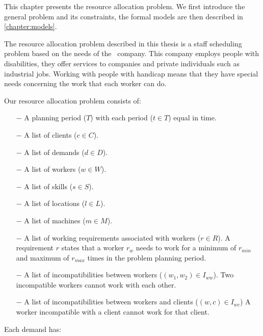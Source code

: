\documentclass[../thesis.tex]{subfiles}
\begin{document}
This chapter presents the resource allocation problem.
We first introduce the general problem and its constraints, 
the formal models are then described in \autoref{chapter:models}.

The resource allocation problem described in this thesis is a staff scheduling problem based on the needs of the \vone\ company. 
This company employs people with disabilities, they offer services to companies and private individuals such 
as industrial jobs. Working with people with handicap means that they have special needs concerning
the work that each worker can do.




Our resource allocation problem consists of:

\begin{itemize}
  \item[$-$] A planning period ($T$) with each period ($t \in T$) equal in time.
  \item[$-$] A list of clients ($c \in C$). 
  \item[$-$] A list of demands ($d \in D$).
  \item[$-$] A list of workers ($w \in W$). 
  \item[$-$] A list of skills ($s \in S$).
  \item[$-$] A list of locations ($l \in L$).
  \item[$-$] A list of machines ($m \in M$).
  \item[$-$] A list of working requirements associated with workers ($r \in R$). A requirement $r$ states that a worker $r_w$
  needs to work for a minimum of $r_{min}$ and maximum of $r_{max}$ times in the problem planning period.  
  \item[$-$] A list of incompatibilities between workers ($(w_1, w_2) \in I_{ww}$).
  Two incompatible workers cannot work with each other.  
  \item[$-$] A list of incompatibilities between workers and clients ($(w, c) \in I_{wc}$)
  A worker incompatible with a client cannot work for that client.
\end{itemize}

Each demand has:
\end{document}
